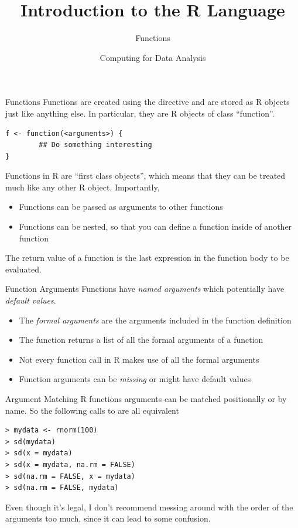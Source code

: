 \documentclass[aspectratio=169]{beamer}
\title[The R Language]{Introduction to the R Language}
\subtitle{Functions}
\date{Computing for Data Analysis}
\begin{document}
\begin{frame}
  \titlepage
\end{frame}

\begin{frame}[fragile]{Functions}
Functions are created using the  directive and are
stored as R objects just like anything else.  In particular, they are
R objects of class ``function''.
\begin{verbatim}
f <- function(<arguments>) {
        ## Do something interesting
}
\end{verbatim}
Functions in R are ``first class objects'', which means that they can
be treated much like any other R object.  Importantly,
\begin{itemize}
\item
Functions can be passed as arguments to other functions
\item
Functions can be nested, so that you can define a function inside of
another function
\end{itemize}
The return value of a function is the last expression in the function
body to be evaluated.
\end{frame}

\begin{frame}{Function Arguments}
Functions have \textit{named arguments} which potentially have
\textit{default values}.
\begin{itemize}
\item
The \textit{formal arguments} are the arguments included in the
function definition
\item
The  function returns a list of all the formal arguments
of a function
\item
Not every function call in R makes use of all the formal arguments
\item
Function arguments can be \textit{missing} or might have default
values
\end{itemize}
\end{frame}

\begin{frame}[fragile]{Argument Matching}
R functions arguments can be matched positionally or by name. So the
following calls to  are all equivalent
\begin{verbatim}
> mydata <- rnorm(100)
> sd(mydata)
> sd(x = mydata)
> sd(x = mydata, na.rm = FALSE)
> sd(na.rm = FALSE, x = mydata)
> sd(na.rm = FALSE, mydata)
\end{verbatim}
Even though it's legal, I don't recommend messing around with the
order of the arguments too much, since it can lead to some confusion.
\end{frame}
\end{document}

